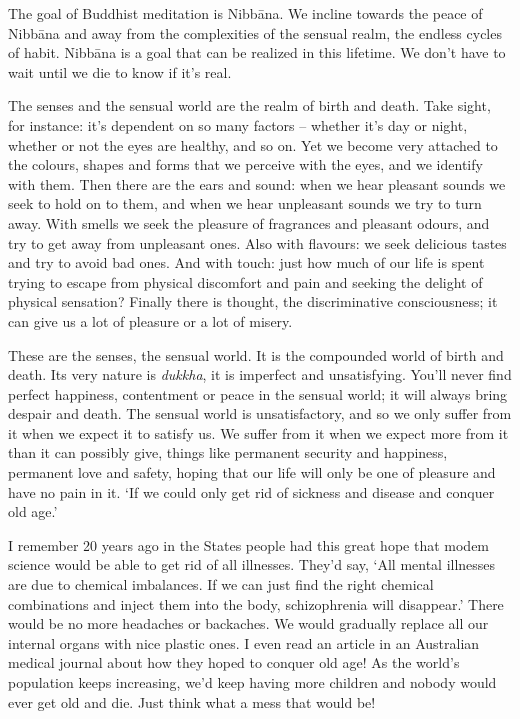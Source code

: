 
The goal of Buddhist meditation is Nibb\=ana. We incline towards the peace of Nibb\=ana and away from the complexities of the sensual realm, the endless cycles of habit. Nibb\=ana is a goal that can be realized in this lifetime. We don't have to wait until we die to know if it's real.

The senses and the sensual world are the realm of birth and death. Take sight, for instance: it's dependent on so many factors -- whether it's day or night, whether or not the eyes are healthy, and so on. Yet we become very attached to the colours, shapes and forms that we perceive with the eyes, and we identify with them. Then there are the ears and sound: when we hear pleasant sounds we seek to hold on to them, and when we hear unpleasant sounds we try to turn away. With smells we seek the pleasure of fragrances and pleasant odours, and try to get away from unpleasant ones. Also with flavours: we seek delicious tastes and try to avoid bad ones. And with touch: just how much of our life is spent trying to escape from physical discomfort and pain and seeking the delight of physical sensation? Finally there is thought, the discriminative consciousness; it can give us a lot of pleasure or a lot of misery.

These are the senses, the sensual world. It is the compounded world of birth and death. Its very nature is \textit{dukkha}, it is imperfect and unsatisfying. You'll never find perfect happiness, contentment or peace in the sensual world; it will always bring despair and death. The sensual world is unsatisfactory, and so we only suffer from it when we expect it to satisfy us. We suffer from it when we expect more from it than it can possibly give, things like permanent security and happiness, permanent love and safety, hoping that our life will only be one of pleasure and have no pain in it. `If we could only get rid of sickness and disease and conquer old age.'

I remember 20 years ago in the States people had this great hope that modem science would be able to get rid of all illnesses. They'd say, `All mental illnesses are due to chemical imbalances. If we can just find the right chemical combinations and inject them into the body, schizophrenia will disappear.' There would be no more headaches or backaches. We would gradually replace all our internal organs with nice plastic ones. I even read an article in an Australian medical journal about how they hoped to conquer old age! As the world's population keeps increasing, we'd keep having more children and nobody would ever get old and die. Just think what a mess that would be!

